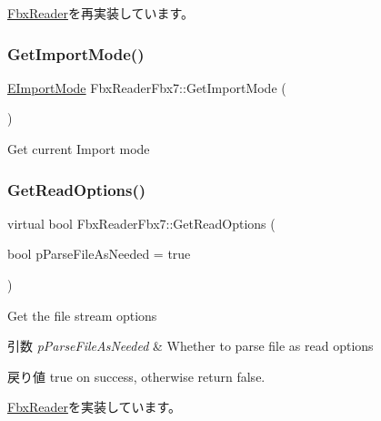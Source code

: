 \hyperlink{class_fbx_reader_a3b218671126e70a29f644407a7f307e9}{Fbx\+Reader}を再実装しています。

\mbox{\label{class_fbx_reader_fbx7_ac4e0596c58d85b554e3236998003cedb}} 
\subsubsection{\texorpdfstring{Get\+Import\+Mode()}{GetImportMode()}}
{\footnotesize\ttfamily \hyperlink{class_fbx_reader_fbx7_adac979509eca2b6dd882c24364e04a3a}{E\+Import\+Mode} Fbx\+Reader\+Fbx7\+::\+Get\+Import\+Mode (\begin{DoxyParamCaption}{ }\end{DoxyParamCaption})}

Get current Import mode \mbox{\label{class_fbx_reader_fbx7_ac8d749c6a5f5c47573f27c26383401de}} 
\subsubsection{\texorpdfstring{Get\+Read\+Options()}{GetReadOptions()}\hspace{0.1cm}{\footnotesize\ttfamily [1/2]}}
{\footnotesize\ttfamily virtual bool Fbx\+Reader\+Fbx7\+::\+Get\+Read\+Options (\begin{DoxyParamCaption}\item[{bool}]{p\+Parse\+File\+As\+Needed = {\ttfamily true} }\end{DoxyParamCaption})\hspace{0.3cm}{\ttfamily [virtual]}}

Get the file stream options 
\begin{DoxyParams}{引数}
{\em p\+Parse\+File\+As\+Needed} & Whether to parse file as read options \\
\hline
\end{DoxyParams}
\begin{DoxyReturn}{戻り値}
true on success, otherwise return false. 
\end{DoxyReturn}


\hyperlink{class_fbx_reader_acea3c118db490378c9aed17512396932}{Fbx\+Reader}を実装しています。

